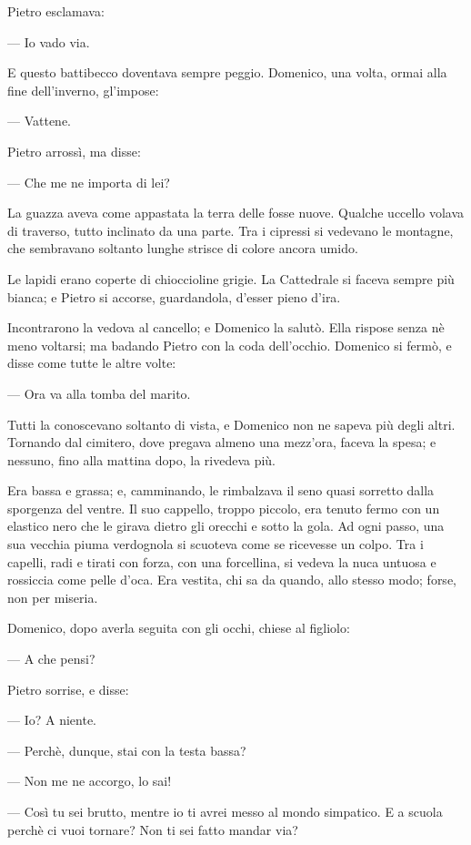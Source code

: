 Pietro esclamava:

— Io vado via.

E questo battibecco doventava sempre peggio. Domenico, una volta, ormai alla fine dell'inverno, gl'impose:

— Vattene.

Pietro arrossì, ma disse:

— Che me ne importa di lei?

La guazza aveva come appastata la terra delle fosse nuove. Qualche uccello volava di traverso, tutto inclinato da una parte. Tra i cipressi si vedevano le montagne, che sembravano soltanto lunghe strisce di colore ancora umido.

Le lapidi erano coperte di chioccioline grigie. La Cattedrale si faceva sempre più bianca; e Pietro si accorse, guardandola, d'esser pieno d'ira.

Incontrarono la vedova al cancello; e Domenico la salutò. Ella rispose senza nè meno voltarsi; ma badando Pietro con la coda dell'occhio. Domenico si fermò, e disse come tutte le altre volte:

— Ora va alla tomba del marito.

Tutti la conoscevano soltanto di vista, e Domenico non ne sapeva più degli altri. Tornando dal cimitero, dove pregava almeno una mezz'ora, faceva la spesa; e nessuno, fino alla mattina dopo, la rivedeva più.

Era bassa e grassa; e, camminando, le rimbalzava il seno quasi sorretto dalla sporgenza del ventre. Il suo cappello, troppo piccolo, era tenuto fermo con un elastico nero che le girava dietro gli orecchi e sotto la gola. Ad ogni passo, una sua vecchia piuma verdognola si scuoteva come se ricevesse un colpo. Tra i capelli, radi e tirati con forza, con una forcellina, si vedeva la nuca untuosa e rossiccia come pelle d'oca. Era vestita, chi sa da quando, allo stesso modo; forse, non per miseria.

Domenico, dopo averla seguita con gli occhi, chiese al figliolo:

— A che pensi?

Pietro sorrise, e disse:

— Io? A niente.

— Perchè, dunque, stai con la testa bassa?

— Non me ne accorgo, lo sai!

— Così tu sei brutto, mentre io ti avrei messo al mondo simpatico. E a scuola perchè ci vuoi tornare? Non ti sei fatto mandar via?

